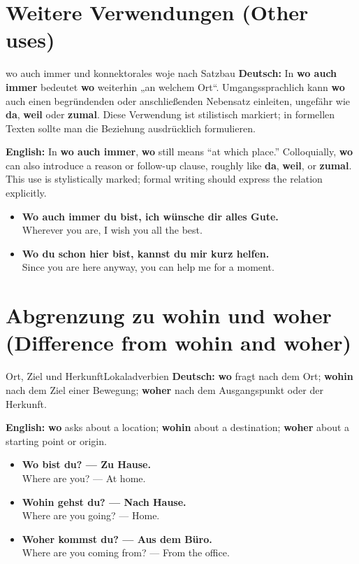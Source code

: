 \documentclass[a4paper,11pt]{article}
\newcommand{\GermanText}[1]{\textbf{Deutsch: }#1\par}
\newcommand{\EnglishText}[1]{{\small\color{SoftGray}\textbf{English: }#1\par}}
\newcommand{\ExampleItem}[2]{\item \textbf{#1}\\{\small\color{SoftGray}#2}}
\begin{document}
\section{Weitere Verwendungen (Other uses)}
\begin{grammarentry}{wo auch immer und konnektorales wo}{je nach Satzbau}
\GermanText{In \textbf{wo auch immer} bedeutet \textbf{wo} weiterhin „an welchem Ort“. Umgangssprachlich kann \textbf{wo} auch einen begründenden oder anschließenden Nebensatz einleiten, ungefähr wie \textbf{da}, \textbf{weil} oder \textbf{zumal}. Diese Verwendung ist stilistisch markiert; in formellen Texten sollte man die Beziehung ausdrücklich formulieren.}
\EnglishText{In \textbf{wo auch immer}, \textbf{wo} still means “at which place.” Colloquially, \textbf{wo} can also introduce a reason or follow-up clause, roughly like \textbf{da}, \textbf{weil}, or \textbf{zumal}. This use is stylistically marked; formal writing should express the relation explicitly.}
\end{grammarentry}
\begin{exbox}\begin{itemize}
\ExampleItem{Wo auch immer du bist, ich wünsche dir alles Gute.}{Wherever you are, I wish you all the best.}
\ExampleItem{Wo du schon hier bist, kannst du mir kurz helfen.}{Since you are here anyway, you can help me for a moment.}
\end{itemize}\end{exbox}

\section{Abgrenzung zu wohin und woher (Difference from wohin and woher)}
\begin{grammarentry}{Ort, Ziel und Herkunft}{Lokaladverbien}
\GermanText{\textbf{wo} fragt nach dem Ort; \textbf{wohin} nach dem Ziel einer Bewegung; \textbf{woher} nach dem Ausgangspunkt oder der Herkunft.}
\EnglishText{\textbf{wo} asks about a location; \textbf{wohin} about a destination; \textbf{woher} about a starting point or origin.}
\end{grammarentry}
\begin{exbox}\begin{itemize}
\ExampleItem{Wo bist du? — Zu Hause.}{Where are you? — At home.}
\ExampleItem{Wohin gehst du? — Nach Hause.}{Where are you going? — Home.}
\ExampleItem{Woher kommst du? — Aus dem Büro.}{Where are you coming from? — From the office.}
\end{itemize}\end{exbox}
\end{document}
